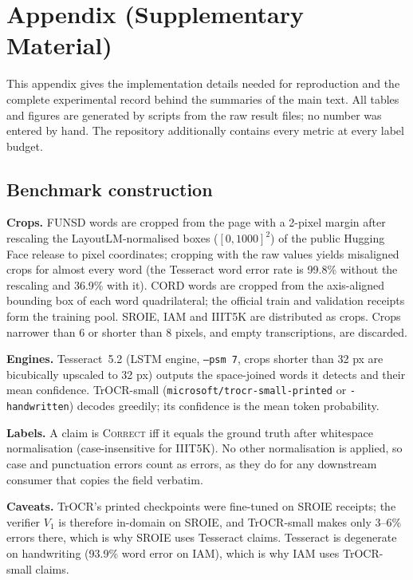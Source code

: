 \section*{Appendix (Supplementary Material)}
\renewcommand{\thesubsection}{A.\arabic{subsection}}
\renewcommand{\thetable}{A\arabic{table}}\renewcommand{\thefigure}{A\arabic{figure}}
\setcounter{table}{0}\setcounter{figure}{0}
This appendix gives the implementation details needed for reproduction and the complete experimental record behind the
summaries of the main text. All tables and figures are generated by scripts from the raw result files; no number was
entered by hand. The repository additionally contains every metric at every label budget.

\subsection{Benchmark construction}
\label{app:data}
\textbf{Crops.} FUNSD words are cropped from the page with a 2-pixel margin after rescaling
the LayoutLM-normalised boxes ($[0,1000]^2$) of the public Hugging Face release to pixel coordinates;
cropping with the raw values yields misaligned crops for almost every word (the Tesseract word error
rate is 99.8\% without the rescaling and 36.9\% with it). CORD words are cropped from the axis-aligned
bounding box of each word quadrilateral; the official train and validation receipts form the training
pool. SROIE, IAM and IIIT5K are distributed as crops. Crops narrower than 6 or shorter than 8 pixels,
and empty transcriptions, are discarded.

\textbf{Engines.} Tesseract~5.2 (LSTM engine, \texttt{--psm 7}, crops shorter than 32 px are
bicubically upscaled to 32 px) outputs the space-joined words it detects and their mean confidence.
TrOCR-small (\texttt{microsoft/trocr-small-printed} or \texttt{-handwritten}) decodes greedily; its
confidence is the mean token probability.

\textbf{Labels.} A claim is \textsc{Correct} iff it equals the ground truth after whitespace
normalisation (case-insensitive for IIIT5K). No other normalisation is applied, so case and punctuation
errors count as errors, as they do for any downstream consumer that copies the field verbatim.

\textbf{Caveats.} TrOCR's printed checkpoints were fine-tuned on SROIE receipts; the verifier
$V_1$ is therefore in-domain on SROIE, and TrOCR-small makes only 3--6\% errors there, which is why
SROIE uses Tesseract claims. Tesseract is degenerate on handwriting (93.9\% word error on IAM), which is
why IAM uses TrOCR-small claims.


